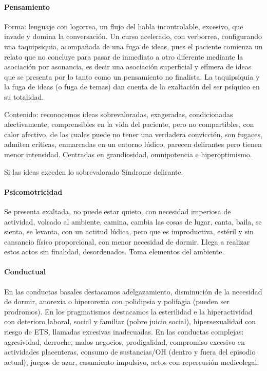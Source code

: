 \documentclass{scrbook}
\begin{document}
\paragraph{Pensamiento}
Forma: lenguaje con logorrea, un flujo del habla incontrolable, excesivo, que invade y domina la conversación. Un curso acelerado, con verborrea, configurando una taquipsiquia, acompañada de una fuga de ideas, pues el paciente comienza un relato que no concluye para pasar de inmediato a otro diferente mediante la asociación por asonancia, es decir una asociación superficial y efímera de ideas que se presenta por lo tanto como un pensamiento no finalista. La taquipsiquia y la fuga de ideas (o fuga de temas) dan cuenta de la exaltación del ser psíquico en su totalidad.

Contenido: reconocemos ideas sobrevaloradas, exageradas, condicionadas afectivamente, comprensibles en la vida del paciente, pero no compartibles, con calor afectivo, de las cuales puede no tener una verdadera convicción, son fugaces, admiten críticas, enmarcadas en un entorno lúdico, parecen delirantes pero tienen menor intensidad. Centradas en grandiosidad, omnipotencia e hiperoptimismo. 

\faStickyNote Si las ideas exceden lo sobrevalorado \faArrowCircleRight Síndrome delirante.
\paragraph{Psicomotricidad}
Se presenta exaltada, no puede estar quieto, con necesidad imperiosa de actividad, volcado al ambiente, camina, cambia las cosas de lugar, canta, baila, se sienta, se levanta, con un actitud lúdica, pero que es improductiva, estéril y sin cansancio físico proporcional, con menor necesidad de dormir. Llega a realizar estos actos sin finalidad, desordenados. Toma elementos del ambiente.
\paragraph{Conductual}
En las conductas basales destacamos adelgazamiento, disminución de la necesidad de dormir, anorexia o hiperorexia con polidipsia y polifagia (pueden ser prodromos). En los pragmatismos destacamos la esterilidad e la hiperactividad con deterioro laboral, social y familiar (pobre juicio social), hipersexualidad con riesgo de ETS, llamadas excesivas inadecuadas. En las conductas complejas: agresividad, derroche, malos negocios, prodigalidad, compromiso excesivo en actividades placenteras, consumo de sustancias/OH (dentro y fuera del episodio actual), juegos de azar, casamiento impulsivo, actos con repercusión medicolegal.
\end{document}
